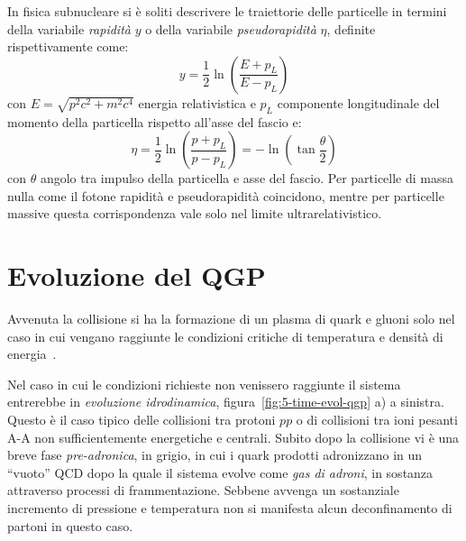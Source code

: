          In fisica subnucleare si è soliti descrivere le traiettorie delle particelle in termini della variabile \textit{rapidità} $y$ o della variabile \textit{pseudorapidità} $\eta$, definite rispettivamente come:
         \begin{equation*}
             y = \frac{1}{2} \ln(\frac{E + p_L}{E - p_L})
         \end{equation*}
        con $E = \sqrt{p^2 c^2 + m^2 c^4}$ energia relativistica e $p_L$ componente longitudinale del momento della particella rispetto all'asse del fascio e:
        \begin{equation*}
            \eta = \frac{1}{2} \ln(\frac{p + p_L}{p - p_L}) = - \ln(\tan{\frac{\theta}{2}})
        \end{equation*}
        con $\theta$ angolo tra impulso della particella e asse del fascio. Per particelle di massa nulla come il fotone rapidità e pseudorapidità coincidono, mentre per particelle massive questa corrispondenza vale solo nel limite ultrarelativistico.

\section{Evoluzione del QGP}
    Avvenuta la collisione si ha la formazione di un plasma di quark e gluoni solo nel caso in cui vengano raggiunte le condizioni critiche di temperatura e densità di energia~\cite{Andronic_2014}.
    
    Nel caso in cui le condizioni richieste non venissero raggiunte il sistema entrerebbe in \textit{evoluzione idrodinamica}, figura~\ref{fig:5-time-evol-qgp} a) a sinistra. Questo è il caso tipico delle collisioni tra protoni $pp$ o di collisioni tra ioni pesanti A-A non sufficientemente energetiche e centrali. Subito dopo la collisione vi è una breve fase \textit{pre-adronica}, in grigio, in cui i quark prodotti adronizzano in un ``vuoto'' QCD dopo la quale il sistema evolve come \textit{gas di adroni}, in sostanza attraverso processi di frammentazione. Sebbene avvenga un sostanziale incremento di pressione e temperatura non si manifesta alcun deconfinamento di partoni in questo caso.

